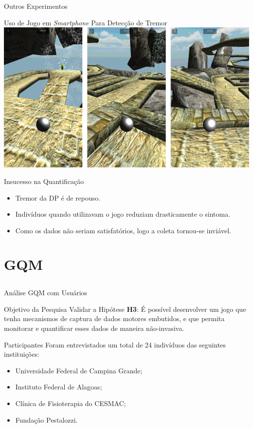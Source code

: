 \documentclass{beamer}
\begin{document}
\begin{frame}{Outros Experimentos}
	\begin{block}{Uso de Jogo em \textit{Smartphone} Para Detecção de Tremor}
	\center \includegraphics[height=1 in]{img/pinball_world.png}
	\end{block}
	\begin{block}{Insucesso na Quantificação}
			\begin{itemize}[<+->]
			\item Tremor da DP é de repouso.
			\item Indivíduos quando utilizavam o jogo reduziam drasticamente o sintoma.
			\item Como os dados não seriam satisfatórios, logo a coleta tornou-se inviável.
		\end{itemize}
	\end{block}
\end{frame}






\section{GQM}
\subsection{}
\begin{frame}{Análise GQM com Usuários} 
    \begin{block}{Objetivo da Pesquisa}
      Validar a Hipótese \textbf{H3}: É possível desenvolver um jogo que tenha mecanismos de captura de dados motores embutidos, e que permita monitorar e quantificar esses dados de maneira não-invasiva.
    \end{block}
		\begin{block}{Participantes}
		Foram entrevistados um total de 24 indivíduos das seguintes instituições:
			\begin{itemize}
				\item Universidade Federal de Campina Grande;
				\item Instituto Federal de Alagoas;
				\item Clínica de Fisioterapia do CESMAC;
				\item Fundação Pestalozzi.
			\end{itemize}
    \end{block}
\end{frame} 
\end{document}
